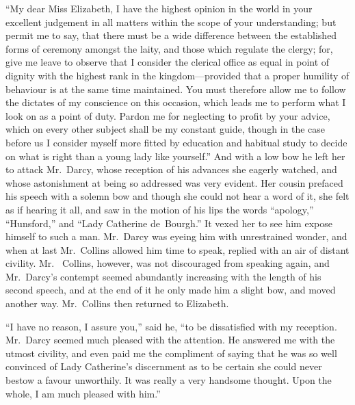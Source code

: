 ``My dear Miss Elizabeth, I have the highest opinion in the world
in your excellent judgement in all matters within the scope of
your understanding; but permit me to say, that there must be a
wide difference between the established forms of ceremony amongst
the laity, and those which regulate the clergy; for, give me
leave to observe that I consider the clerical office as equal in
point of dignity with the highest rank in the kingdom---provided
that a proper humility of behaviour is at the same time
maintained.  You must therefore allow me to follow the dictates
of my conscience on this occasion, which leads me to perform what
I look on as a point of duty.  Pardon me for neglecting to profit
by your advice, which on every other subject shall be my constant
guide, though in the case before us I consider myself more fitted
by education and habitual study to decide on what is right than
a young lady like yourself.''  And with a low bow he left her to
attack Mr.\ Darcy, whose reception of his advances she eagerly
watched, and whose astonishment at being so addressed was very
evident.  Her cousin prefaced his speech with a solemn bow and
though she could not hear a word of it, she felt as if hearing
it all, and saw in the motion of his lips the words ``apology,''
``Hunsford,'' and ``Lady Catherine de~Bourgh.''  It vexed her to
see him expose himself to such a man.  Mr.\ Darcy was eyeing him
with unrestrained wonder, and when at last Mr.\ Collins allowed
him time to speak, replied with an air of distant civility.  Mr.\ %
Collins, however, was not discouraged from speaking again, and
Mr.\ Darcy's contempt seemed abundantly increasing with the length
of his second speech, and at the end of it he only made him a
slight bow, and moved another way.  Mr.\ Collins then returned
to Elizabeth.

``I have no reason, I assure you,'' said he, ``to be dissatisfied
with my reception.  Mr.\ Darcy seemed much pleased with the
attention.  He answered me with the utmost civility, and even
paid me the compliment of saying that he was so well convinced
of Lady Catherine's discernment as to be certain she could never
bestow a favour unworthily.  It was really a very handsome
thought.  Upon the whole, I am much pleased with him.''

